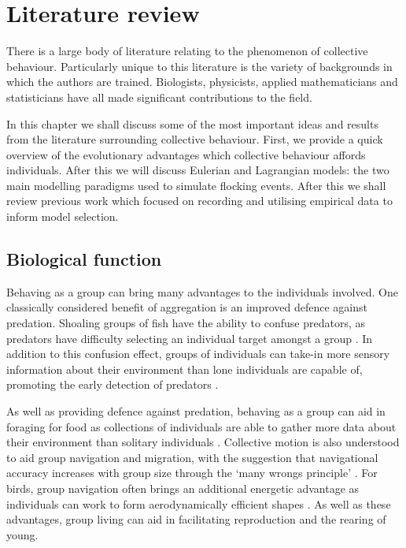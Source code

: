 \graphicspath{{fig/lit_review/}}

\chapter{Literature review}
\label{cha:lit_review}

There is a large body of literature relating to the phenomenon of collective
behaviour. Particularly unique to this literature is the variety of backgrounds
in which the authors are trained. Biologists, physicists, applied
mathematicians and statisticians have all made significant contributions to the
field.

In this chapter we shall discuss some of the most important ideas and results
from the literature surrounding collective behaviour. First, we provide a quick
overview of the evolutionary advantages which collective behaviour affords
individuals. After this we will discuss Eulerian and Lagrangian models: the two
main modelling paradigms used to simulate flocking events. After this we shall
review previous work which focused on recording and utilising empirical data to
inform model selection.

\section{Biological function}
\label{sec:biological_function}

Behaving as a group can bring many advantages to the individuals involved. One
classically considered benefit of aggregation is an improved defence against
predation. Shoaling groups of fish have the ability to confuse predators, as
predators have difficulty selecting an individual target amongst a group
\parencite{landeau86}. In addition to this confusion effect, groups of
individuals can take-in more sensory information about their environment than
lone individuals are capable of, promoting the early detection of predators
\parencite{pitcher93}.

As well as providing defence against predation, behaving as a group can aid in
foraging for food as collections of individuals are able to gather more data
about their environment than solitary individuals \parencite{clark86}.
Collective motion is also understood to aid group navigation and migration,
with the suggestion that navigational accuracy increases with group size
through the `many wrongs principle' \parencite{simmons04}. For birds, group
navigation often brings an additional energetic advantage as individuals can
work to form aerodynamically efficient shapes \parencite{weimerskirch01}. As
well as these advantages, group living can aid in facilitating reproduction and
the rearing of young.

